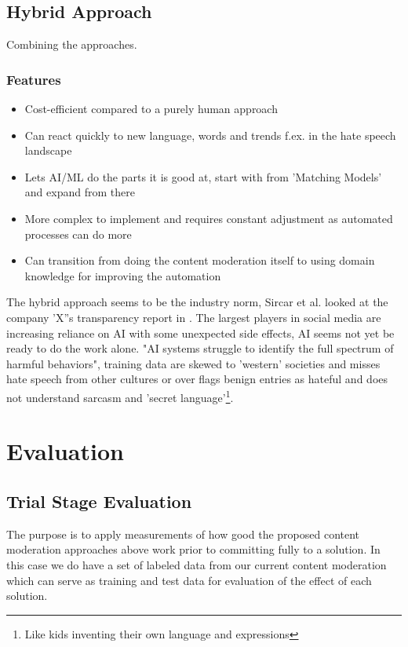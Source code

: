 \documentclass[
	letterpaper, %
	12pt, %
	unnumberedsections, %
	twoside, %
]{LTJournalArticle}
\begin{document}
\subsection{Hybrid Approach}
Combining the approaches.

\subsubsection*{Features}
\begin{itemize}
	\item Cost-efficient compared to a purely human approach
	\item Can react quickly to new language, words and trends f.ex. in the hate speech landscape
	\item Lets AI/ML do the parts it is good at, start with from 'Matching Models' and expand from there
	\item More complex to implement and requires constant adjustment as automated processes can do more
	\item Can transition from doing the content moderation itself to using domain knowledge for improving the automation
\end{itemize}
The hybrid approach seems to be the industry norm, Sircar et al. looked at the company 'X''s transparency report in \cite{ForbesXFindings}. The largest players in social media are increasing reliance on AI with some unexpected side effects, AI seems not yet be ready to do the work alone. "AI systems struggle to identify the full spectrum of harmful behaviors"\cite{ForbesXFindings}, training data are skewed to 'western' societies and misses hate speech from other cultures or over flags benign entries as hateful and does not understand sarcasm and 'secret language'\footnote{Like kids inventing their own language and expressions}.


\section{Evaluation}

\subsection{Trial Stage Evaluation}
The purpose is to apply measurements of how good the proposed content moderation approaches above work prior to committing fully to a solution. In this case we do have a set of labeled data from our current content moderation which can serve as training and test data for evaluation of the effect of each solution.
\end{document}

